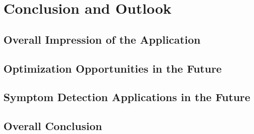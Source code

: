 
\chapter{Conclusion and Outlook}
\section{Overall Impression of the Application}
\section{Optimization Opportunities in the Future}
\section{Symptom Detection Applications in the Future}
\section{Overall Conclusion}

